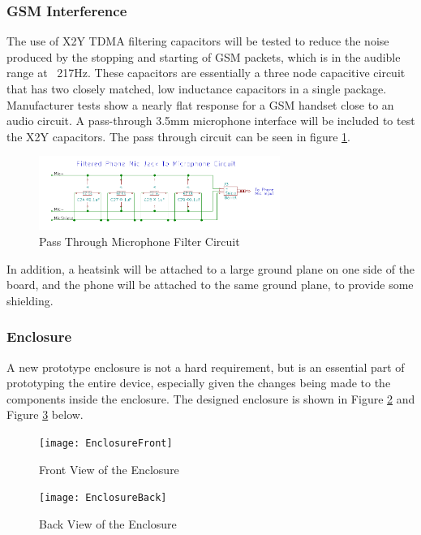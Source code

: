\documentclass{article}
\numberwithin{figure}{section}
\numberwithin{equation}{section}
\begin{document}
{\subsubsection{GSM Interference}

The use of X2Y TDMA filtering capacitors will be tested to reduce the noise produced by the stopping and starting of GSM packets, which is in the audible range at ~217Hz. These capacitors are essentially a three node capacitive circuit that has two closely matched, low inductance capacitors in a single package. Manufacturer tests show a nearly flat response for a GSM handset close to an audio circuit. A pass-through 3.5mm microphone interface will be included to test the X2Y capacitors. The pass through circuit can be seen in figure \ref{fig:x2y}.

\begin{figure}[H]
	\centering
	\includegraphics[width=0.7\textwidth]{X2Yfiltercircuit}
	\caption{Pass Through Microphone Filter Circuit}
	\label{fig:x2y}
\end{figure}

In addition, a heatsink will be attached to a large ground plane on one side of the board, and the phone will be attached to the same ground plane, to provide some shielding.

\subsubsection{Enclosure}

A new prototype enclosure is not a hard requirement, but is an essential part of prototyping the entire device, especially given the changes being made to the components inside the enclosure. The designed enclosure is shown in Figure \ref{fig:enclosurefront} and Figure \ref{fig:enclosureback} below.

\begin{figure}[H]
	\centering
	\texttt{[image: EnclosureFront]}
	\caption{Front View of the Enclosure}
	\label{fig:enclosurefront}
\end{figure}

\begin{figure}[H]
	\centering
	\texttt{[image: EnclosureBack]}
	\caption{Back View of the Enclosure}
	\label{fig:enclosureback}
\end{figure}

}
\end{document}

